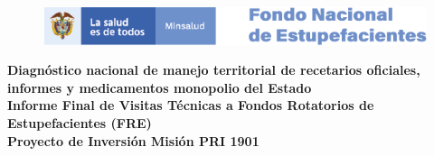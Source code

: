 \hypertarget{TitlePage}{}
\begin{center}
	\begin{figure}
		\centering%
		\includegraphics[width=\linewidth]{www/logos_MinSalud_FNE.png}
	\end{figure}
	\thispagestyle{empty} 
	\vspace*{0.4cm}	
	\huge{\bfseries\sffamily\textbf{
			Diagnóstico nacional de manejo territorial de recetarios oficiales, informes y medicamentos monopolio del Estado}}\\[3.7cm]
	\large{\bfseries\sffamily\textbf{
			Informe Final de Visitas Técnicas a Fondos Rotatorios de Estupefacientes (FRE)}}\\[3.7cm]	
	\Large{\bfseries\sffamily\textbf{
			Proyecto de Inversión Misión PRI 1901}}\\[3.7cm]
	\normalsize{}\\
\end{center}
